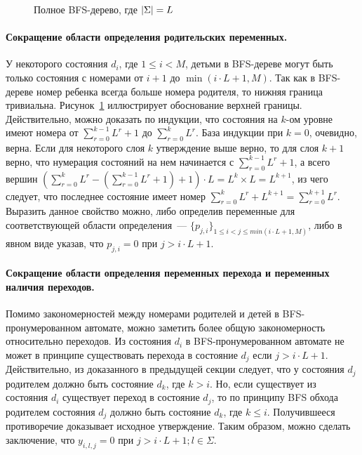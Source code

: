 \begin{figure}[ht]
  \centering
  \scalebox{0.625}{}
  \caption{Полное BFS-дерево, где $\lvert\Sigma\rvert=L$}
  \label{img:full-bfs}
\end{figure}

\paragraph{Сокращение области определения родительских переменных.}
У некоторого состояния $d_{i}$, где $1 \leq i < M$, детьми в BFS-дереве могут быть только состояния с номерами от $i + 1$ до $\min\left(i \cdot L + 1, M\right)$.
Так как в BFS-дереве номер ребенка всегда больше номера родителя, то нижняя граница тривиальна.
Рисунок~\ref{img:full-bfs} иллюстрирует обоснование верхней границы.
Действительно, можно доказать по индукции, что состояния на $k$-ом уровне имеют номера от $\sum_{r = 0}^{k - 1}L^{r} + 1$ до $\sum_{r = 0}^{k}L^{r}$.
База индукции при $k = 0$, очевидно, верна.
Если для некоторого слоя $k$ утверждение выше верно, то для слоя $k + 1$ верно, что нумерация состояний на нем начинается с $\sum_{r = 0}^{k - 1}L^{r} + 1$, а всего вершин $\left(\sum_{r = 0}^{k}L^{r} - \left(\sum_{r = 0}^{k - 1}L^{r} + 1\right) + 1\right) \cdot L = L^{k} \times L = L^{k + 1}$, из чего следует, что последнее состояние имеет номер $\sum_{r = 0}^{k}L^{r} + L^{k + 1} = \sum_{r = 0}^{k + 1}L^{r}$.
Выразить данное свойство можно, либо определив переменные для соответствующей области определения~{---} $\{p_{j,i}\}_{1 \leq i < j \leq min(i \cdot L + 1, M)}$, либо в явном виде указав, что $p_{j,i} = 0$ при $j > i \cdot L + 1$.

\paragraph{Сокращение области определения переменных перехода и переменных наличия переходов.}
Помимо закономерностей между номерами родителей и детей в BFS-пронумерованном автомате, можно заметить более общую закономерность относительно переходов.
Из состояния $d_{i}$ в BFS-пронумерованном автомате не может в принципе существовать перехода в состояние $d_{j}$ если $j > i \cdot L + 1$.
Действительно, из доказанного в предыдущей секции следует, что у состояния $d_{j}$ родителем должно быть состояние $d_{k}$, где $k > i$.
Но, если существует из состояния $d_{i}$ существует переход в состояние $d_{j}$, то по принципу BFS обхода родителем состояния $d_{j}$ должно быть состояние $d_{k}$, где $k \leq i$.
Получившееся противоречие доказывает исходное утверждение.
Таким образом, можно сделать заключение, что $y_{i,l,j} = 0$ при $j > i \cdot L + 1; l \in \Sigma$.

